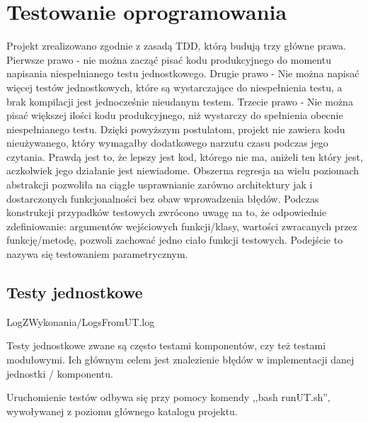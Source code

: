 \chapter{Testowanie oprogramowania}
    Projekt zrealizowano zgodnie z zasadą TDD, którą budują trzy główne prawa.
    \newline
    Pierwsze prawo - nie można zacząć pisać kodu produkcyjnego do momentu napisania niespełnianego testu jednostkowego.
    \newline
    Drugie prawo - Nie można napisać więcej testów jednostkowych, które są wystarczające do niespełnienia testu, a brak kompilacji jest jednocześnie nieudanym testem.
    \newline
    Trzecie prawo - Nie można pisać większej ilości kodu produkcyjnego, niż wystarczy do spełnienia obecnie niespełnianego testu\cite{martin2014czysty}.
    \newline
    Dzięki powyższym postulatom, projekt nie zawiera kodu nieużywanego, który wymagałby dodatkowego narzutu czasu podczas jego czytania. Prawdą jest to, że lepszy jest kod,
    którego nie ma, aniżeli ten który jest, aczkolwiek jego działanie jest niewiadome. Obszerna regresja na wielu poziomach abstrakcji pozwoliła na ciągłe usprawnianie zarówno architektury
    jak i dostarczonych funkcjonalności bez obaw wprowadzenia błędów. Podczas konstrukcji przypadków testowych zwrócono uwagę na to, że odpowiednie zdefiniowanie: 
    argumentów wejściowych funkcji/klasy, wartości zwracanych przez funkcję/metodę, pozwoli zachować jedno ciało funkcji testowych. Podejście to nazywa się testowaniem parametrycznym.

    
\section{Testy jednostkowe}
    
    {LogZWykonania/LogsFromUT.log}
    
    Testy jednostkowe zwane są często testami komponentów, czy też testami modułowymi. Ich głównym celem jest znalezienie błędów 
    w implementacji danej jednostki / komponentu\cite{Testowanie}.
    
    Uruchomienie testów odbywa się przy pomocy komendy ,,bash runUT.sh'', wywoływanej z poziomu głównego katalogu projektu.
    
